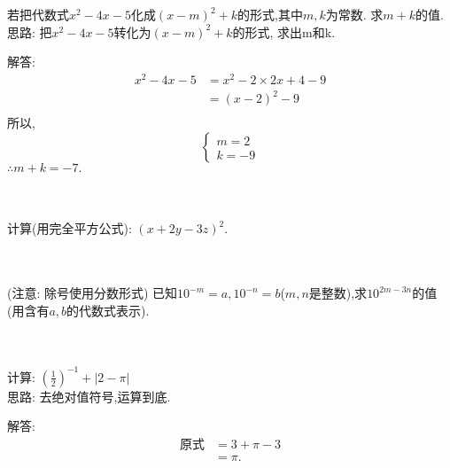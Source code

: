 \item {
    若把代数式$x^2-4x-5$化成$(x-m)^2+k$的形式,其中$m,k$为常数. 求$m+k$的值.
    \ifshowSolution
        \fangsong{}
        \\
        思路: 把$x^2-4x-5$转化为$(x-m)^2+k$的形式, 求出m和k.

        解答: 
        \begin{align*}
            x^2-4x-5 &= x^2 - 2\times 2x + 4 - 9 \\
            &= (x-2)^2 - 9 \\
        \end{align*}
        所以,
        \[\left\{ 
            \begin{array}{lc}
                m = 2\\
                k =-9
            \end{array}
        \right.\]
        $\therefore m+k=-7.$
    \else
        \\ \\ \\
    \fi
}

\item {
    计算(用完全平方公式): $(x+2y-3z)^2$.
}
\\ \\ \\

\item {
    (注意: 除号使用分数形式) 已知$10^{-m}=a, 10^{-n}=b$($m, n$是整数),求$10^{2m-3n}$的值(用含有$a, b$的代数式表示).
}
\\ \\ \\

\begin{comment}
\item {
    已知$2^x=3, 2^y=6, 2^z=12$,判断下列有关$x, y, z$的数量关系式的对错.\\
    (1) $x+z=2y$\\
    (2) $x+y+3=2z$\\
    (3) $4x=z$\\
    (4) $x+1=y$
}
\\ \\
\end{comment}

\item {
    计算: $ (\frac{1}{2})^{-1} + \lvert 2-\pi \rvert $
    \ifshowSolution
    \fangsong{}
    \\
    思路: 去绝对值符号,运算到底.

    解答: 
    \begin{align*}
        \mbox{原式} &= 3 + \pi - 3\\
        &= \pi.
    \end{align*}
    \else
        \\ \\ \\
    \fi
}

